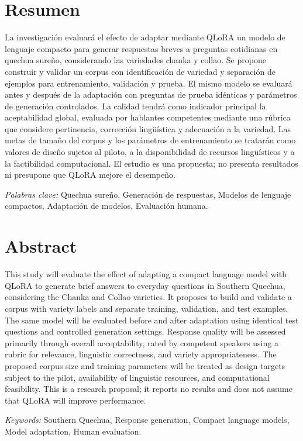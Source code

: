 \newpage
{}
{}
\chapter*{Resumen}
La investigación evaluará el efecto de adaptar mediante QLoRA un modelo de lenguaje compacto para generar respuestas breves a preguntas cotidianas en quechua sureño, considerando las variedades chanka y collao. Se propone construir y validar un corpus con identificación de variedad y separación de ejemplos para entrenamiento, validación y prueba. El mismo modelo se evaluará antes y después de la adaptación con preguntas de prueba idénticas y parámetros de generación controlados. La calidad tendrá como indicador principal la aceptabilidad global, evaluada por hablantes competentes mediante una rúbrica que considere pertinencia, corrección lingüística y adecuación a la variedad. Las metas de tamaño del corpus y los parámetros de entrenamiento se tratarán como valores de diseño sujetos al piloto, a la disponibilidad de recursos lingüísticos y a la factibilidad computacional. El estudio es una propuesta; no presenta resultados ni presupone que QLoRA mejore el desempeño.

\textit{Palabras clave:} Quechua sureño, Generación de respuestas, Modelos de lenguaje compactos, Adaptación de modelos, Evaluación humana.

\newpage
{}
{}
\chapter*{Abstract}
This study will evaluate the effect of adapting a compact language model with QLoRA to generate brief answers to everyday questions in Southern Quechua, considering the Chanka and Collao varieties. It proposes to build and validate a corpus with variety labels and separate training, validation, and test examples. The same model will be evaluated before and after adaptation using identical test questions and controlled generation settings. Response quality will be assessed primarily through overall acceptability, rated by competent speakers using a rubric for relevance, linguistic correctness, and variety appropriateness. The proposed corpus size and training parameters will be treated as design targets subject to the pilot, availability of linguistic resources, and computational feasibility. This is a research proposal; it reports no results and does not assume that QLoRA will improve performance.

\textit{Keywords:} Southern Quechua, Response generation, Compact language models, Model adaptation, Human evaluation.
